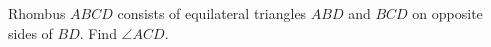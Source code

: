 Rhombus $ABCD$ consists of equilateral triangles $ABD$ and $BCD$ on opposite sides of $BD$. Find $\angle ACD$.
